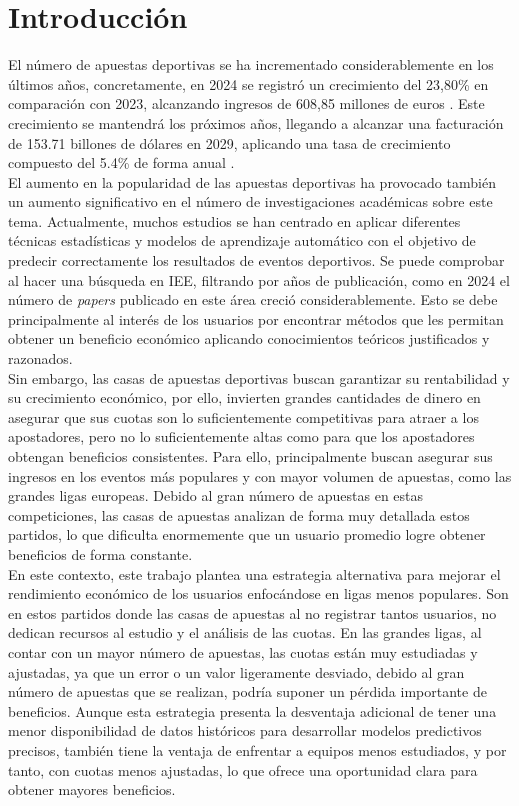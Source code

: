 \section{Introducción}

El número de apuestas deportivas se ha incrementado considerablemente en los últimos años, concretamente, en 2024 se registró un crecimiento del 23,80\% en comparación con 2023, alcanzando ingresos de 608,85 millones de euros \cite{casinos2024}. Este crecimiento se mantendrá los próximos años, llegando a alcanzar una facturación de 153.71 billones de dólares en 2029, aplicando una tasa de crecimiento compuesto del 5.4\% de forma anual \cite{tbrc2025sportsbetting}.\\

El aumento en la popularidad de las apuestas deportivas ha provocado también un aumento significativo en el número de investigaciones académicas sobre este tema. Actualmente, muchos estudios se han centrado en aplicar diferentes técnicas estadísticas y modelos de aprendizaje automático con el objetivo de predecir correctamente los resultados de eventos deportivos. Se puede comprobar al hacer una búsqueda en IEE, filtrando por años de publicación, como en 2024 el número de \textit{papers} publicado en este área creció considerablemente. Esto se debe principalmente al interés de los usuarios por encontrar métodos que les permitan obtener un beneficio económico aplicando conocimientos teóricos justificados y razonados.\\

Sin embargo, las casas de apuestas deportivas buscan garantizar su rentabilidad y su crecimiento económico, por ello, invierten grandes cantidades de dinero en asegurar que sus cuotas son lo suficientemente competitivas para atraer a los apostadores, pero no lo suficientemente altas como para que los apostadores obtengan beneficios consistentes. Para ello, principalmente buscan asegurar sus ingresos en los eventos más populares y con mayor volumen de apuestas, como las grandes ligas europeas. Debido al gran número de apuestas en estas competiciones, las casas de apuestas analizan de forma muy detallada estos partidos, lo que dificulta enormemente que un usuario promedio logre obtener beneficios de forma constante.\\

En este contexto, este trabajo plantea una estrategia alternativa para mejorar el rendimiento económico de los usuarios enfocándose en ligas menos populares. Son en estos partidos donde las casas de apuestas al no registrar tantos usuarios, no dedican recursos al estudio y el análisis de las cuotas. En las grandes ligas, al contar con un mayor número de apuestas, las cuotas están muy estudiadas y ajustadas, ya que un error o un valor ligeramente desviado, debido al gran número de apuestas que se realizan, podría suponer un pérdida importante de beneficios. Aunque esta estrategia presenta la desventaja adicional de tener una menor disponibilidad de datos históricos para desarrollar modelos predictivos precisos, también tiene la ventaja de enfrentar a equipos menos estudiados, y por tanto, con cuotas menos ajustadas, lo que ofrece una oportunidad clara para obtener mayores beneficios.\\ 

